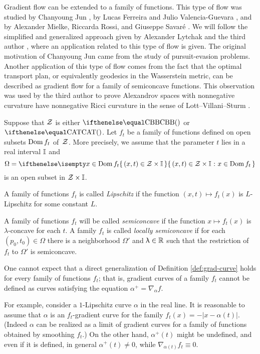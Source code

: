 Gradient flow can be extended to a family of functions.
This type of flow was studied by Chanyoung Jun \cite{jun-thesis,jun:grad}, by Lucas Ferreira and Julio Valencia-Guevara \cite{ferreira-valencia}, and by Alexander Mielke, Riccarda Rossi, and Giuseppe Savar\'{e} \cite{mielke-rossi-savare}.
We will follow the simplified and generalized approach given by Alexander Lytchak and the third author \cite{lytchak-petrunin-2020}, where an application related to this type of flow is given.
The original motivation of Chanyoung Jun came from the study of pursuit-evasion problems.
Another application of this type of flow comes from the fact that
 the optimal transport plan, or equivalently geodesics in the Wasserstein metric, can be described as gradient flow for a family of semiconcave functions.
This observation was used by the third author to prove Alexandrov spaces with nonnegative curvature have nonnegative Ricci curvature in the sense of Lott--Villani--Sturm \cite{petrunin:optimal}.

Suppose that $\mathcal{Z}$ is either $\Alex{}$ or $\CAT{}$.
Let $f_t$ be a family of functions defined on open subsets $\mathop{\rm Dom}\nolimits f_t$ of~$\mathcal{Z}$.
More precisely, we assume that the parameter $t$ lies in a real interval $\mathbb{I}$ and 
\[\Omega=\set{(x,t)\in\spc{Z}\times \II}{x\in\Dom f_t}\]
is an open subset in $\spc{Z}\times \II$.

A family of functions $f_t$ is called \emph{Lipschitz} if 
the function $(x,t)\mapsto f_t(x)$ is 
$L$-Lipschitz for some constant $L$.

A family of functions $f_t$ will be called \emph{semiconcave} if 
the function $x\mapsto f_t(x)$ is $\lambda$-concave for each $t$.
A family $f_t$ is called \emph{locally semiconcave} if for each $(p_0,t_0)\in \Omega$ there is a neighborhood $\Omega'$ and $\lambda\in\RR$ such that the restriction of $f_t$ to $\Omega'$ is semiconcave. 

One cannot expect that a direct generalization of Definition \ref{def:grad-curve}  holds for every family of functions $f_t$; that is, gradient curves of a family $f_t$ cannot be defined as curves satisfying the equation $\alpha^+=\nabla_{\alpha} f$.

For example, consider a $1$-Lipschitz curve $\alpha$ in the real line. 
It is reasonable to assume that $\alpha$ is an $f_t$-gradient curve for the family $f_t(x)=-|x-\alpha(t)|$.
(Indeed $\alpha$ can be realized as a limit of  gradient curves for a family of functions obtained by smoothing $f_t$.)
On the other hand, $\alpha^+(t)$ might be undefined,
and even if it is defined, in general $\alpha^+(t)\ne0$,  while $\nabla_{\alpha(t)} f_t\equiv0$.


